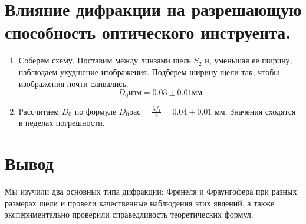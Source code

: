 \documentclass[a4paper]{article}
\begin{document}
\section{Влияние дифракции на разрешающую способность оптического инструента.}

\begin{enumerate}
	\item Соберем схему. Поставим между линзами щель $S_2$ и, уменьшая ее ширину, наблюдаем ухудшение изображения. Подберем ширину щели так, чтобы изображения почти сливались.
	\begin{equation}
		D_0{изм} = 0.03 \pm 0.01 мм
	\end{equation}
	\item Рассчитаем $D_0$ по формуле $D_0{рас} = \frac{\lambda f_1}{b} = 0.04 \pm 0.01 $ мм. Значения сходятся в педелах погрешности.
\end{enumerate}

\section{Вывод} 
 
Мы изучили два основных типа дифракции: Френеля и Фраунгофера при разных размерах щели и провели качественные наблюдения этих явлений, а также экспериментально проверили справедливость теоретических формул.  
\end{document}
